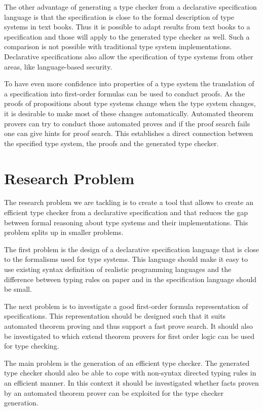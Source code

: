 \documentclass[preprint]{sigplanconf}
\begin{document}
The other advantage of generating a type checker from a declarative
specification language is that the specification is close to the
formal description of type systems in text books. Thus it is possible
to adapt results from text books to a specification and those will
apply to the generated type checker as well. Such a comparison is not
possible with traditional type system implementations. Declarative
specifications also allow the specification of type systems from other
areas, like language-based security.


To have even more confidence into properties of a type system the
translation of a specification into first-order formulas can be used
to conduct proofs. As the proofs of propositions about type systems
change when the type system changes, it is desirable to make most of
these changes automatically. Automated theorem provers can try to
conduct those automated proves and if the proof search fails one can
give hints for proof search. This establishes a direct connection
between the specified type system, the proofs and the generated type
checker.
\section{Research Problem}
The research problem we are tackling is to create a tool that allows
to create an efficient type checker from a declarative specification
and that reduces the gap between formal reasoning about type systems
and their implementations. This problem splits up in smaller problems.

The first problem is the design of a declarative specification
language that is close to the formalisms used for type systems. This
language should make it easy to use existing syntax definition of
realistic programming languages and the difference between typing
rules on paper and in the specification language should be small.

The next problem is to investigate a good first-order formula
representation of specifications. This representation should be
designed such that it suits automated theorem proving and thus support
a fast prove search. It should also be investigated to which extend
theorem provers for first order logic can be used for type checking.

The main problem is the generation of an efficient type checker. 
The generated type checker should also be able to cope with non-syntax
directed typing rules in an efficient manner. In this context it
should be investigated whether facts proven by an automated theorem
prover can be exploited for the type checker generation.
\end{document}
